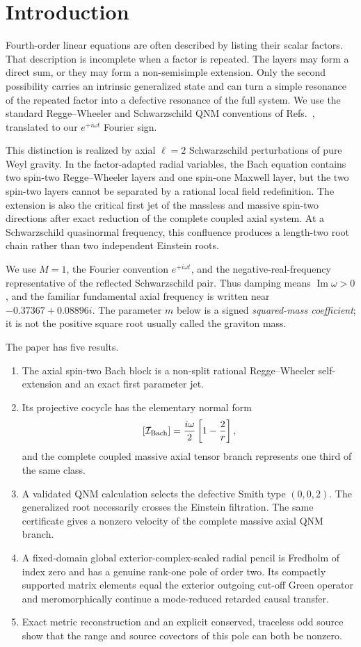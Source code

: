 \documentclass[11pt]{article}
\theoremstyle{remark}
\begin{document}
\section{Introduction}

Fourth-order linear equations are often described by listing their scalar
factors.  That description is incomplete when a factor is repeated.  The
layers may form a direct sum, or they may form a non-semisimple extension.
Only the second possibility carries an intrinsic generalized state and can
turn a simple resonance of the repeated factor into a defective resonance
of the full system.
We use the standard Regge--Wheeler and Schwarzschild QNM conventions of
Refs.~\cite{reggewheeler1957,leaver1985}, translated to our
\(e^{+i\omega t}\) Fourier sign.

This distinction is realized by axial \(\ell=2\) Schwarzschild
perturbations of pure Weyl gravity.  In the factor-adapted radial variables,
the Bach equation
contains two spin-two Regge--Wheeler layers and one spin-one Maxwell layer,
but the two spin-two layers cannot be separated by a rational local field
redefinition.  The extension is also the critical first jet of the
massless and massive spin-two directions after exact reduction of the
complete coupled axial system.  At a
Schwarzschild quasinormal frequency, this confluence produces a
length-two root chain rather than two independent Einstein roots.

We use \(M=1\), the Fourier convention \(e^{+i\omega t}\), and the
negative-real-frequency representative of the reflected Schwarzschild
pair.  Thus damping means \(\operatorname{Im}\omega>0\), and the familiar
fundamental axial frequency is written near
\(-0.37367+0.08896i\).  The parameter \(m\) below is a signed
\emph{squared-mass coefficient}; it is not the positive square root usually
called the graviton mass.

The paper has five results.
\begin{enumerate}
\item The axial spin-two Bach block is a non-split rational
  Regge--Wheeler self-extension and an exact first parameter jet.
\item Its projective cocycle has the elementary normal form
  \[
    [\mathcal I_{\rm Bach}]
    =\frac{i\omega}{2}\left[1-\frac2r\right],
  \]
  and the complete coupled massive axial tensor branch represents one
  third of the same class.
\item A validated QNM calculation selects the defective Smith type
  \((0,0,2)\).  The generalized root necessarily crosses the Einstein
  filtration.  The same certificate gives a nonzero velocity of the
  complete massive axial QNM branch.
\item A fixed-domain global exterior-complex-scaled radial pencil is
  Fredholm of index zero and has a genuine rank-one pole of order two.
  Its compactly supported matrix elements equal the exterior outgoing
  cut-off Green operator and meromorphically continue a mode-reduced
  retarded causal transfer.
\item Exact metric reconstruction and an explicit conserved, traceless odd
  source show that the range and source covectors of this pole can both be
  nonzero.
\end{enumerate}
\end{document}
